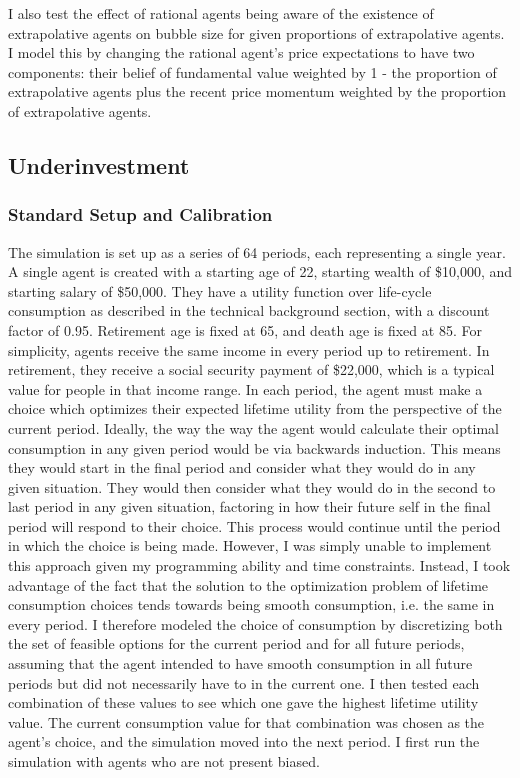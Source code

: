 \documentclass[10pt,twocolumn]{article}
\begin{document}
I  also test the effect of rational agents being aware of the existence of extrapolative agents on bubble size for given proportions of extrapolative agents. I model this by changing the rational agent's price expectations to have two components: their belief of fundamental value weighted by 1 - the proportion of extrapolative agents plus the recent price momentum weighted by the proportion of extrapolative agents. 

\subsection{Underinvestment}
\subsubsection{Standard Setup and Calibration}
The simulation is set up as a series of 64 periods, each representing a single year. A single agent is created with a starting age of 22, starting wealth of \$10,000, and starting salary of \$50,000. They have a utility function over life-cycle consumption as described in the technical background section, with a discount factor of 0.95. Retirement age is fixed at 65, and death age is fixed at 85. For simplicity, agents receive the same income in every period up to retirement. In retirement, they receive a social security payment of \$22,000, which is a typical value for people in that income range. In each period, the agent must make a choice which optimizes their expected lifetime utility from the perspective of the current period.
Ideally, the way the way the agent would calculate their optimal consumption in any given period would be via backwards induction. This means they would start in the final period and consider what they would do in any given situation. They would then consider what they would do in the second to last period in any given situation, factoring in how their future self in the final period will respond to their choice. This process would continue until the period in which the choice is being made. However, I was simply unable to implement this approach given my programming ability and time constraints. Instead, I took advantage of the fact that the solution to the optimization problem of lifetime consumption choices tends towards being smooth consumption, i.e. the same in every period. I therefore modeled the choice of consumption by discretizing both the set of feasible options for the current period and for all future periods, assuming that the agent intended to have smooth consumption in all future periods but did not necessarily have to in the current one. I then tested each combination of these values to see which one gave the highest lifetime utility value. The current consumption value for that combination was chosen as the agent's choice, and the simulation moved into the next period. I first run the simulation with agents who are not present biased. 
 
\end{document}
